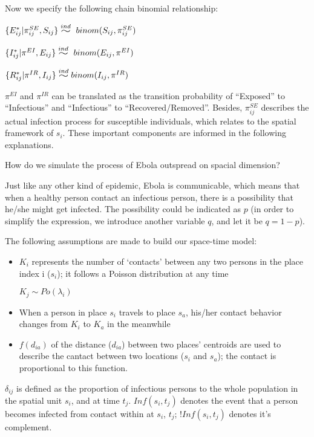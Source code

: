 \documentclass[12pt]{article}
\newcommand{\widesim}[2][1.5]{
      \mathrel{\overset{#2}{\scalebox{#1}[1]{$\sim$}}}
  }
\newcommand \mbreak {\\ \vspace{0.1in}}
\begin{document}
   Now we specify the following chain binomial relationship: 
    \vspace{0.15in}
    {

        
       { $\{E_{ij}^* | \pi^{SE}_{ij}, S_{ij} \} \widesim{ind}\ binom(S_{ij}, \pi^{SE}_{ij})$ }\mbreak

       { $\{I_{ij}^* | \pi^{EI}, E_{ij} \} \widesim{ind}\ binom(E_{ij}, \pi^{EI})$}\mbreak

       { $\{R_{ij}^* | \pi^{IR}, I_{ij} \} \widesim{ind} binom(I_{ij}, \pi^{IR})$}\mbreak
    }

$\pi^{EI}$ and $\pi^{IR}$ can be translated as the transition probability of ``Exposed'' to ``Infectious'' and ``Infectious'' to ``Recovered/Removed''. Besides, $\pi^{SE}_{ij}$ describes the actual infection process for susceptible individuals, which relates to the spatial framework of $ s_i $. These important components are informed in the following explanations.

How do we simulate the process of Ebola outspread on spacial dimension?

Just like any other kind of epidemic, Ebola is communicable, which means that when a healthy person contact an infectious person, there is a possibility that he/she might get infected. The possibility could be indicated as $p$ (in order to simplify the expression, we introduce another variable $q$, and let it be $q=1-p$).

The following assumptions are made to build our space-time model:

\begin{itemize}

    \item $K_i$ represents the number of `contacts' between any two persons in the place index i ($s_i$); it follows a Poisson distribution at any time
    \begin{center}
        $K_j \sim Po(\lambda_i)$
    \end{center}
    \item When a person in place $s_i$ travels to place $s_a$, his/her contact behavior changes from $K_i$ to $K_a$ in the meanwhile 
    \item $f(d_{ia})$ of the distance ($d_{ia}$) between two places' centroids are used to describe the cantact between two locations ($s_i$ and $s_a$); the contact is proportional to this function.

\end{itemize}

$\delta_{ij}$ is defined as the proportion of infectious persons to the whole population in the spatial unit $s_i$, and at time $t_j$. $Inf(s_i, t_j)$ denotes the event that a person becomes 
infected from contact within at $s_i$, $t_j$; $!Inf(s_i, t_j)$ denotes it's complement.
\end{document}
